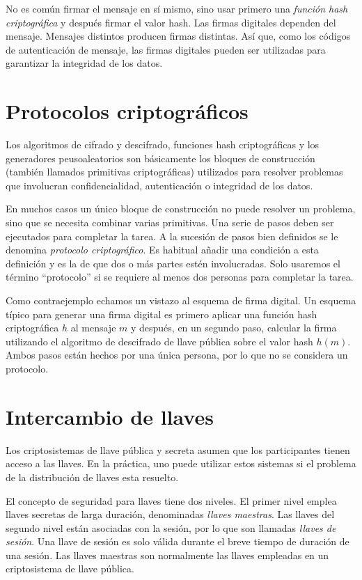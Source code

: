\documentclass[12pt]{book}
\theoremstyle{definition}
\begin{document}
No es común firmar el mensaje en sí mismo, sino usar primero una \textit{función hash criptográfica} y después firmar el valor hash. Las firmas digitales dependen del mensaje. Mensajes distintos producen firmas distintas. Así que, como los códigos de autenticación de mensaje, las firmas digitales pueden ser utilizadas para garantizar la integridad de los datos.


\section{Protocolos criptográficos}

Los algoritmos de cifrado y descifrado, funciones hash criptográficas y los generadores peusoaleatorios son básicamente los bloques de construcción (también llamados primitivas criptográficas) utilizados para resolver problemas que involucran confidencialidad, autenticación o integridad de los datos.

En muchos casos un único bloque de construcción no puede resolver un problema, sino que se necesita combinar varias primitivas. Una serie de pasos deben ser ejecutados para completar la tarea. A la sucesión de pasos bien definidos se le denomina \textit{protocolo criptográfico}. Es habitual añadir una condición a esta definición y es la de que dos o más partes estén involucradas. Solo usaremos el término ``protocolo'' si se requiere al menos dos personas para completar la tarea.

Como contraejemplo echamos un vistazo al esquema de firma digital. Un esquema típico para generar una firma digital es primero aplicar una función hash criptográfica $h$ al mensaje $m$ y después, en un segundo paso, calcular la firma utilizando el algoritmo de descifrado de llave pública sobre el valor hash $h(m)$. Ambos pasos están hechos por una única persona, por lo que no se considera un protocolo.

\section{Intercambio de llaves}
Los criptosistemas de llave pública y secreta asumen que los participantes tienen acceso a las llaves. En la práctica, uno puede utilizar estos sistemas si el problema de la distribución de llaves esta resuelto.

El concepto de seguridad para llaves tiene dos niveles. El primer nivel emplea llaves secretas de larga duración, denominadas \textit{llaves maestras}. Las llaves del segundo nivel están asociadas con la sesión, por lo que son llamadas \textit{llaves de sesión}. Una llave de sesión es solo válida durante el breve tiempo de duración de una sesión. Las llaves maestras son normalmente las llaves empleadas en un criptosistema de llave pública.
\end{document}
